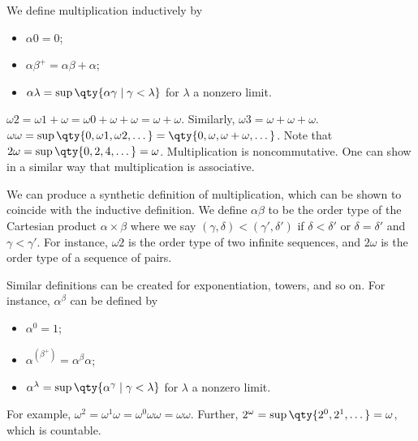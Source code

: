 We define multiplication inductively by
\begin{itemize}
    \item $\alpha 0 = 0$;
    \item $\alpha \beta^+ = \alpha\beta + \alpha$;
    \item $\alpha \lambda = \sup\qty{\alpha \gamma \mid \gamma < \lambda}$ for $\lambda$ a nonzero limit.
\end{itemize}
\begin{example}
    $\omega 2 = \omega 1 + \omega = \omega 0 + \omega + \omega = \omega + \omega$.
    Similarly, $\omega 3 = \omega + \omega + \omega$.
    $\omega \omega = \sup\qty{0, \omega 1, \omega 2, \dots} = \qty{0, \omega, \omega + \omega, \dots}$.
    Note that $2 \omega = \sup\qty{0, 2, 4, \dots} = \omega$.
    Multiplication is noncommutative.
    One can show in a similar way that multiplication is associative.
\end{example}
We can produce a synthetic definition of multiplication, which can be shown to coincide with the inductive definition.
We define $\alpha \beta$ to be the order type of the Cartesian product $\alpha \times \beta$ where we say $(\gamma, \delta) < (\gamma', \delta')$ if $\delta < \delta'$ or $\delta = \delta'$ and $\gamma < \gamma'$.
For instance, $\omega 2$ is the order type of two infinite sequences, and $2 \omega$ is the order type of a sequence of pairs.

Similar definitions can be created for exponentiation, towers, and so on.
For instance, $\alpha^\beta$ can be defined by
\begin{itemize}
    \item $\alpha^0 = 1$;
    \item $\alpha^{(\beta^+)} = \alpha^\beta \alpha$;
    \item $\alpha^\lambda = \sup\qty{\alpha^\gamma \mid \gamma < \lambda}$ for $\lambda$ a nonzero limit.
\end{itemize}
For example, $\omega^2 = \omega^1 \omega = \omega^0 \omega \omega = \omega \omega$.
Further, $2^\omega = \sup\qty{2^0, 2^1, \dots} = \omega$, which is countable.
